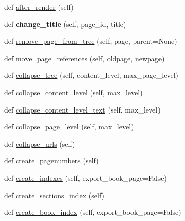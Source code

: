 \begin{DoxyCompactItemize}
\item 
def \hyperlink{classtexla_1_1PageTree_1_1PageTree_1_1PageTree_aef29edcb58ecab6f73b2fc00105bfd32}{after\+\_\+render} (self)
\item 
\hypertarget{classtexla_1_1PageTree_1_1PageTree_1_1PageTree_af00c05b145278ad8e9b4b67b9871ec28}{}\label{classtexla_1_1PageTree_1_1PageTree_1_1PageTree_af00c05b145278ad8e9b4b67b9871ec28} 
def {\bfseries change\+\_\+title} (self, page\+\_\+id, title)
\item 
def \hyperlink{classtexla_1_1PageTree_1_1PageTree_1_1PageTree_a4766b39f5fa963645b80afbb52c2c051}{remove\+\_\+page\+\_\+from\+\_\+tree} (self, page, parent=None)
\item 
def \hyperlink{classtexla_1_1PageTree_1_1PageTree_1_1PageTree_a0eefaf0f844683ae949fa1120f9179d3}{move\+\_\+page\+\_\+references} (self, oldpage, newpage)
\item 
def \hyperlink{classtexla_1_1PageTree_1_1PageTree_1_1PageTree_ae913f178f121266966856b75dde090f4}{collapse\+\_\+tree} (self, content\+\_\+level, max\+\_\+page\+\_\+level)
\item 
def \hyperlink{classtexla_1_1PageTree_1_1PageTree_1_1PageTree_af7af6e47f12cf9a4b37b6d3109bf6b63}{collapse\+\_\+content\+\_\+level} (self, max\+\_\+level)
\item 
def \hyperlink{classtexla_1_1PageTree_1_1PageTree_1_1PageTree_ac4014d964d66c7a28b6ad2817c627bfd}{collapse\+\_\+content\+\_\+level\+\_\+text} (self, max\+\_\+level)
\item 
def \hyperlink{classtexla_1_1PageTree_1_1PageTree_1_1PageTree_aad58c1721ddcdd1e6e3ba7ad0248b4d7}{collapse\+\_\+page\+\_\+level} (self, max\+\_\+level)
\item 
def \hyperlink{classtexla_1_1PageTree_1_1PageTree_1_1PageTree_a5f9436e36fa9fdd44f5e219cec82c672}{collapse\+\_\+urls} (self)
\item 
def \hyperlink{classtexla_1_1PageTree_1_1PageTree_1_1PageTree_ac21290653e2f62b62d23d61ad0f856bd}{create\+\_\+pagenumbers} (self)
\item 
def \hyperlink{classtexla_1_1PageTree_1_1PageTree_1_1PageTree_a10ee2f8c6ce2484cf8a32e4ca8edce56}{create\+\_\+indexes} (self, export\+\_\+book\+\_\+page=False)
\item 
def \hyperlink{classtexla_1_1PageTree_1_1PageTree_1_1PageTree_a3ff84eeb07714017d2048fe7a92be982}{create\+\_\+sections\+\_\+index} (self)
\item 
def \hyperlink{classtexla_1_1PageTree_1_1PageTree_1_1PageTree_a35dca3874408cd36aa781ed52d471336}{create\+\_\+book\+\_\+index} (self, export\+\_\+book\+\_\+page=False)
\end{DoxyCompactItemize}
